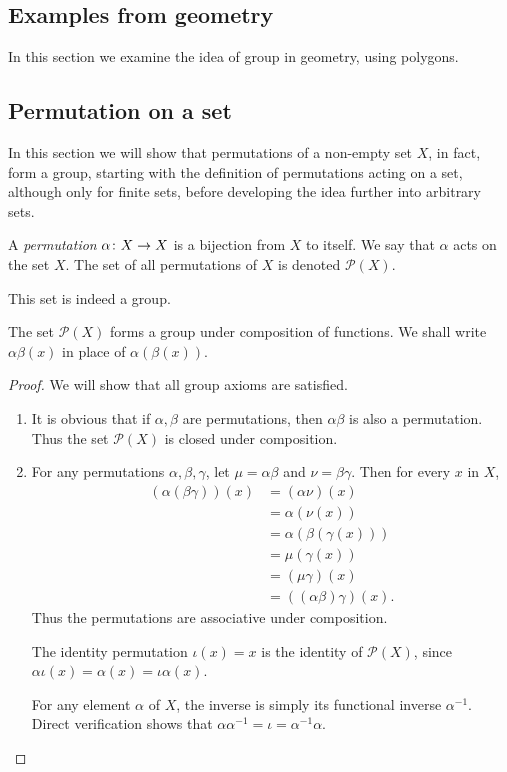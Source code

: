 \documentclass[main.tex]{subfiles}
\begin{document}
	\subsection{Examples from geometry}
		In this section we examine the idea of group in geometry, using polygons.
		
		
	\subsection{Permutation on a set}
	 In this section we will show that permutations of a non-empty set $X$, in fact, form a group, starting with the definition of permutations acting on a set, although only for finite sets, before developing the idea further into arbitrary sets.
				
				\begin{definition}
					A \textit{permutation} $\alpha \colon X \rightarrow X$ is a bijection from $X$ to itself. We say that $\alpha$ acts on the set $X$. The set of all permutations of $X$ is denoted $\mathcal{P}(X)$.				
				\end{definition}
				This set is indeed a group.
				\begin{theorem}
					The set $\mathcal{P}(X)$ forms a group under composition of functions. We shall write $\alpha\beta(x)$ in place of $\alpha(\beta(x))$.
				\end{theorem}
				\begin{proof}
					We will show that all group axioms are satisfied.
					\begin{enumerate}
						\item It is obvious that if $\alpha, \beta$ are permutations, then $\alpha\beta$ is also a permutation. Thus the set $\mathcal{P}(X)$ is closed under composition.
						
						\item For any permutations $\alpha, \beta, \gamma$, let $\mu = \alpha\beta$ and $\nu = \beta\gamma$. Then for every $x$ in $X$,
						\begin{equation}
						\begin{aligned}
							(\alpha(\beta\gamma))(x) & = (\alpha\nu)(x) \\
									& = \alpha(\nu(x))	\\
									& = \alpha(\beta(\gamma(x))) \\
									& = \mu(\gamma(x))	\\
									& = (\mu\gamma)(x) \\
									& = ((\alpha\beta)\gamma)(x).
						\end{aligned}
						\end{equation}
						Thus the permutations are associative under composition.
						
						\ii The identity permutation $\iota (x) = x$ is the identity of $\mathcal{P}(X)$, since $\alpha\iota(x) = \alpha(x) = \iota\alpha(x)$.
						
						\ii For any element $\alpha$ of $X$, the inverse is simply its functional inverse $\alpha^{-1}$. Direct verification shows that $\alpha\alpha^{-1} = \iota = \alpha^{-1}\alpha$.
					\end{enumerate}
				\end{proof}
\end{document}
